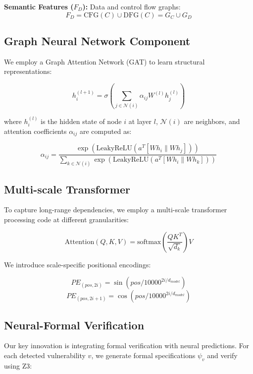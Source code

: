 \documentclass[10pt,journal,compsoc]{IEEEtran}
\begin{document}
\textbf{Semantic Features ($F_D$):} Data and control flow graphs:
\begin{equation}
F_D = \text{CFG}(C) \cup \text{DFG}(C) = G_C \cup G_D
\end{equation}

\subsection{Graph Neural Network Component}
We employ a Graph Attention Network (GAT) \cite{velickovic2018graph} to learn structural representations:

\begin{equation}
h_i^{(l+1)} = \sigma\left(\sum_{j \in \mathcal{N}(i)} \alpha_{ij} W^{(l)} h_j^{(l)}\right)
\end{equation}

where $h_i^{(l)}$ is the hidden state of node $i$ at layer $l$, $\mathcal{N}(i)$ are neighbors, and attention coefficients $\alpha_{ij}$ are computed as:

\begin{equation}
\alpha_{ij} = \frac{\exp(\text{LeakyReLU}(a^T [W h_i \| W h_j]))}{\sum_{k \in \mathcal{N}(i)} \exp(\text{LeakyReLU}(a^T [W h_i \| W h_k]))}
\end{equation}

\subsection{Multi-scale Transformer}
To capture long-range dependencies, we employ a multi-scale transformer processing code at different granularities:

\begin{equation}
\text{Attention}(Q, K, V) = \text{softmax}\left(\frac{QK^T}{\sqrt{d_k}}\right)V
\end{equation}

We introduce scale-specific positional encodings:

\begin{equation}
PE_{(pos,2i)} = \sin(pos/10000^{2i/d_{model}})
\end{equation}
\begin{equation}
PE_{(pos,2i+1)} = \cos(pos/10000^{2i/d_{model}})
\end{equation}

\subsection{Neural-Formal Verification}
Our key innovation is integrating formal verification with neural predictions. For each detected vulnerability $v$, we generate formal specifications $\psi_v$ and verify using Z3:
\end{document}
